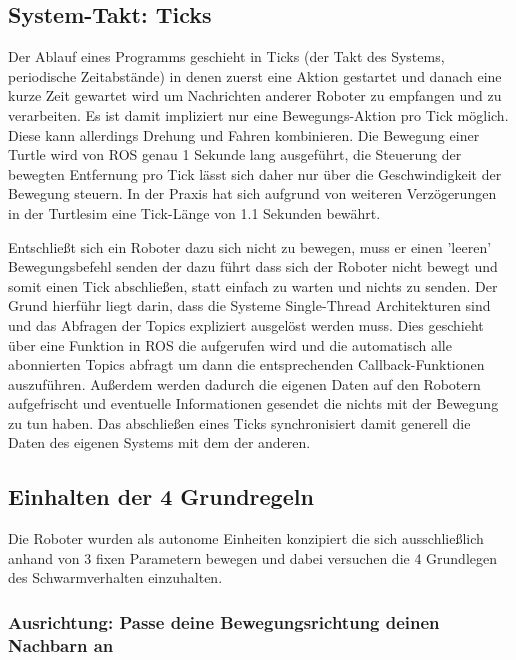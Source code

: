 \subsection*{System-Takt: Ticks}
Der Ablauf eines Programms geschieht in Ticks (der Takt des Systems, periodische Zeitabstände) in denen zuerst eine Aktion gestartet und danach eine kurze Zeit gewartet wird um Nachrichten anderer Roboter zu empfangen und zu verarbeiten. Es ist damit impliziert nur eine Bewegungs-Aktion pro Tick möglich. Diese kann allerdings Drehung und Fahren kombinieren.
Die Bewegung einer Turtle wird von ROS genau 1 Sekunde lang ausgeführt, die Steuerung der bewegten Entfernung pro Tick lässt sich daher nur über die Geschwindigkeit der Bewegung steuern. In der Praxis hat sich aufgrund von weiteren Verzögerungen in der Turtlesim eine Tick-Länge von 1.1 Sekunden bewährt.

Entschließt sich ein Roboter dazu sich nicht zu bewegen, muss er einen 'leeren' Bewegungsbefehl senden der dazu führt dass sich der Roboter nicht bewegt und somit einen Tick abschließen, statt einfach zu warten und nichts zu senden. Der Grund hierführ liegt darin, dass die Systeme Single-Thread Architekturen sind und das Abfragen der Topics expliziert ausgelöst werden muss. Dies geschieht über eine Funktion in ROS die aufgerufen wird und die automatisch alle abonnierten Topics abfragt um dann die entsprechenden Callback-Funktionen auszuführen. Außerdem werden dadurch die eigenen Daten auf den Robotern aufgefrischt und eventuelle Informationen gesendet die nichts mit der Bewegung zu tun haben. Das abschließen eines Ticks synchronisiert damit generell die Daten des eigenen Systems mit dem der anderen.

\subsection*{Einhalten der 4 Grundregeln}
Die Roboter wurden als autonome Einheiten konzipiert die sich ausschließlich anhand von 3 fixen Parametern bewegen und dabei versuchen die 4 Grundlegen des Schwarmverhalten einzuhalten.

\subsubsection*{Ausrichtung: Passe deine Bewegungsrichtung deinen Nachbarn an}

